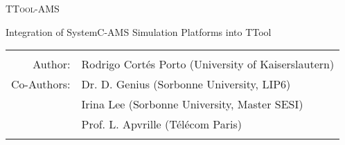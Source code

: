 \begin{titlepage}
\setcounter{page}{-1}
\begin{center}



\vfill
\vfill

\textsc{\Huge TTool-AMS}\\[6ex]
\centerline{\Large Integration of SystemC-AMS Simulation Platforms into TTool}
\vspace{20pt}

\vfill
\vfill

 \begin{tabular}{rl}\hline\\
         Author:                   & \quad Rodrigo Cortés Porto (University of Kaiserslautern) \\[1.5ex]
 Co-Authors:                    & \quad Dr. D. Genius (Sorbonne University, LIP6)\\[1.5ex]
 & \quad Irina Lee (Sorbonne University, Master SESI)\\[1.5ex]
                            & \quad Prof. L. Apvrille (Télécom Paris) \\[1.5ex]\\\hline
 \end{tabular}
\end{center}
 
    
\end{titlepage}

